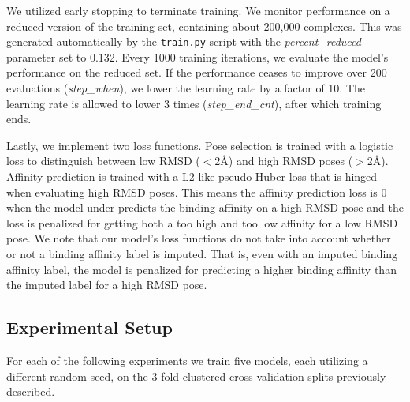 \documentclass[journal=jmcmar,manuscript=article]{achemso}
\begin{document}
We utilized early stopping to terminate training.
We monitor performance on a reduced version of the training set, containing about 200,000 complexes.
This was generated automatically by the \texttt{train.py} script with the \textit{percent\_reduced} parameter set to 0.132.
Every 1000 training iterations, we evaluate the model's performance on the reduced set.
If the performance ceases to improve over 200 evaluations (\textit{step\_when}), we lower the learning rate by a factor of 10.
The learning rate is allowed to lower 3 times (\textit{step\_end\_cnt}), after which training ends.

Lastly, we implement two loss functions.
Pose selection is trained with a logistic loss to distinguish between low RMSD ($<2${\AA}) and high RMSD poses ($>2${\AA}).
Affinity prediction is trained with a L2-like pseudo-Huber loss that is hinged when evaluating high RMSD poses.
This means the affinity prediction loss is 0 when the model under-predicts the binding affinity on a high RMSD pose and the loss is penalized for getting both a too high and too low affinity for a low RMSD pose.
We note that our model's loss functions do not take into account whether or not a binding affinity label is imputed.
That is, even with an imputed binding affinity label, the model is penalized for predicting a higher binding affinity than the imputed label for a high RMSD pose.

\subsection{Experimental Setup}
For each of the following experiments we train five models, each utilizing a different random seed, on the 3-fold clustered cross-validation splits previously described.
\end{document}
